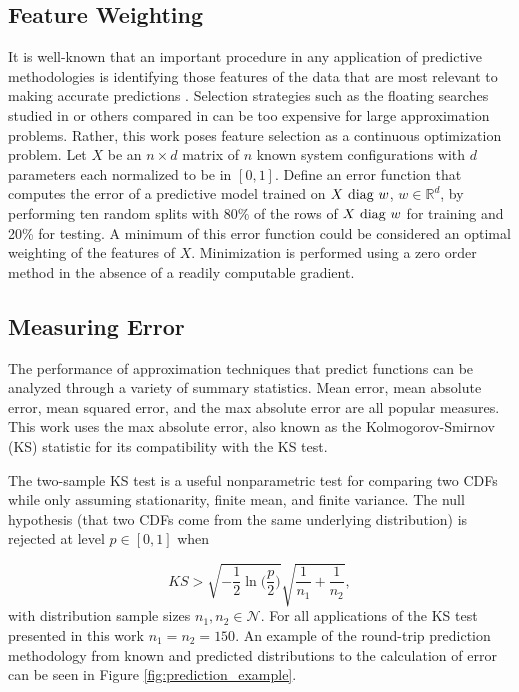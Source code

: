 \documentclass[letterpaper, 10 pt, conference]{ieeeconf}  %
\begin{document}
\subsection{Feature Weighting}
\label{sec:feature_weighting}

It is well-known that an important procedure in any application of predictive methodologies is identifying those features of the data that are most relevant to making accurate predictions \cite{guyon2003introduction}. Selection strategies such as the floating searches studied in \cite{pudil1994floating} or others compared in \cite{ferri1994comparative} can be too expensive for large approximation problems. Rather, this work poses feature selection as a continuous optimization problem. Let $X$ be an $n \times d$ matrix of $n$ known system configurations with $d$ parameters each normalized to be in $[0,1]$. Define an error function that computes the error of a predictive model trained on $X\hbox{ diag }w$, $w \in \mathbb{R}^d$,  by performing ten random splits with 80\% of the rows of $X\hbox{ diag }w$ for training and 20\% for testing. A minimum of this error function could be considered an optimal weighting of the features of $X$. Minimization is performed using a zero order method in the absence of a readily computable gradient.

\subsection{Measuring Error}

The performance of approximation techniques that predict functions can be analyzed through a variety of summary statistics. Mean error, mean absolute error, mean squared error, and the max absolute error are all popular measures. This work uses the max absolute error, also known as the Kolmogorov-Smirnov (KS) statistic \cite{lilliefors1967kolmogorov} for its compatibility with the KS test.

The two-sample KS test is a useful nonparametric test for comparing two CDFs while only assuming stationarity, finite mean, and finite variance. The null hypothesis (that two CDFs come from the same underlying distribution) is rejected at level $p \in [0,1]$ when

$$ KS > \sqrt{-\frac{1}{2}\ln\biggl(\frac{p}{2}\biggr)} \sqrt{\frac{1}{n_1} + \frac{1}{n_2}}, $$
with distribution sample sizes $n_1,n_2 \in \mathcal{N}$. For all applications of the KS test presented in this work $n_1 = n_2 = 150$. An example of the round-trip prediction methodology from known and predicted distributions to the calculation of error can be seen in Figure \ref{fig:prediction_example}.
\end{document}
